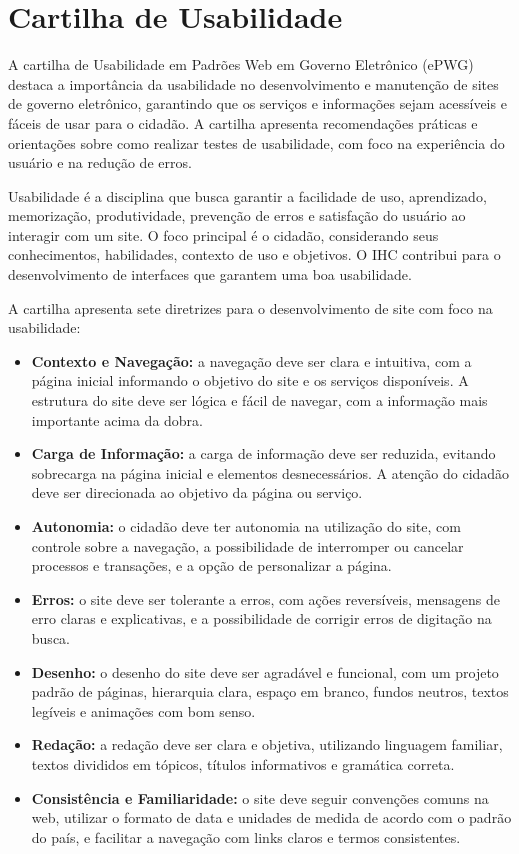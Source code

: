 \documentclass[
  12pt,
  openright,
  twoside,
  a4paper,
  english,
  french,
  spanish,
  brazil
]{abntex2}
\begin{document}
\section{Cartilha de Usabilidade}

A cartilha de Usabilidade em Padrões Web em Governo Eletrônico (ePWG) destaca a
importância da usabilidade no desenvolvimento e manutenção de sites de governo
eletrônico, garantindo que os serviços e informações sejam acessíveis e fáceis
de usar para o cidadão. A cartilha apresenta recomendações práticas e
orientações sobre como realizar testes de usabilidade, com foco na experiência
do usuário e na redução de erros.

Usabilidade é a disciplina que busca garantir a facilidade de uso, aprendizado,
memorização, produtividade, prevenção de erros e satisfação do usuário ao
interagir com um site. O foco principal é o cidadão, considerando seus
conhecimentos, habilidades, contexto de uso e objetivos. O IHC contribui para o
desenvolvimento de interfaces que garantem uma boa usabilidade.

A cartilha apresenta sete diretrizes para o desenvolvimento de site com foco na
usabilidade:

\begin{itemize}
  \item
    \textbf{Contexto e Navegação:} a navegação deve ser clara e intuitiva, com a
    página inicial informando o objetivo do site e os serviços disponíveis. A
    estrutura do site deve ser lógica e fácil de navegar, com a informação mais
    importante acima da dobra.
  \item
    \textbf{Carga de Informação:} a carga de informação deve ser reduzida,
    evitando sobrecarga na página inicial e elementos desnecessários. A atenção
    do cidadão deve ser direcionada ao objetivo da página ou serviço.
  \item
    \textbf{Autonomia:} o cidadão deve ter autonomia na utilização do site, com
    controle sobre a navegação, a possibilidade de interromper ou cancelar
    processos e transações, e a opção de personalizar a página.
  \item
    \textbf{Erros:} o site deve ser tolerante a erros, com ações reversíveis,
    mensagens de erro claras e explicativas, e a possibilidade de corrigir erros
    de digitação na busca.
  \item
    \textbf{Desenho:} o desenho do site deve ser agradável e funcional, com um
    projeto padrão de páginas, hierarquia clara, espaço em branco, fundos
    neutros, textos legíveis e animações com bom senso.
  \item
    \textbf{Redação:} a redação deve ser clara e objetiva, utilizando linguagem
    familiar, textos divididos em tópicos, títulos informativos e gramática
    correta.
  \item
    \textbf{Consistência e Familiaridade:} o site deve seguir convenções comuns
    na web, utilizar o formato de data e unidades de medida de acordo com o
    padrão do país, e facilitar a navegação com links claros e termos
    consistentes.
\end{itemize}
\end{document}
